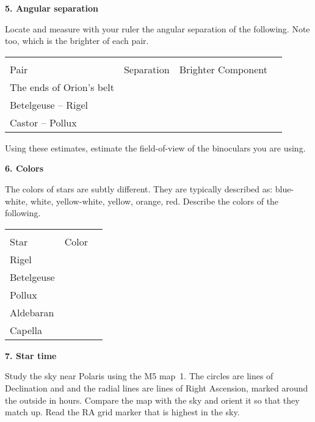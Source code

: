 \bigskip\noindent
{\bf 5. Angular separation}

\bigskip\noindent
Locate and measure with your ruler the angular separation of the following.
Note too, which is the brighter of each pair.

\begin{center}
\begin{tabular}{lccc} \hline \\ [-6pt]
Pair   & \hspace{1cm} Separation \hspace{1cm}& Brighter Component \\ [6pt]
\hline
The ends of Orion's belt      & &        \\ \hline
Betelgeuse -- Rigel     & &       \\ \hline
Castor -- Pollux       & &       \\ \hline
\end{tabular}
\end{center}

\noindent Using these estimates, estimate the field-of-view of the binoculars
you are using.

\clearpage 
\medskip\noindent
{\bf 6. Colors}

\bigskip\noindent 
The colors of stars are subtly different. 
They are typically described as: blue-white, white,
yellow-white, yellow, orange, red.  Describe the colors of the following.
  
\begin{center}
\begin{tabular}{lcc} \hline \\  [-6pt]
Star   &\hspace{1.5cm}  Color \hspace{1.5cm} &  \\  [6pt]
\hline
Rigel    &   &        \\ \hline
Betelgeuse     &   &       \\ \hline
Pollux     &   &       \\ \hline
Aldebaran    &   &       \\  \hline
Capella    &   &     \\  \hline 
\end{tabular}
\end{center}


\medskip\noindent
{\bf 7. Star time}

\bigskip\noindent
Study the sky near Polaris using the M5 map~1.  
The circles are lines of Declination and 
and the radial lines are lines of Right Ascension, marked around the 
outside in hours. Compare the map with the sky and
orient it so that they match up. Read the RA grid marker that is
highest in the sky. 

